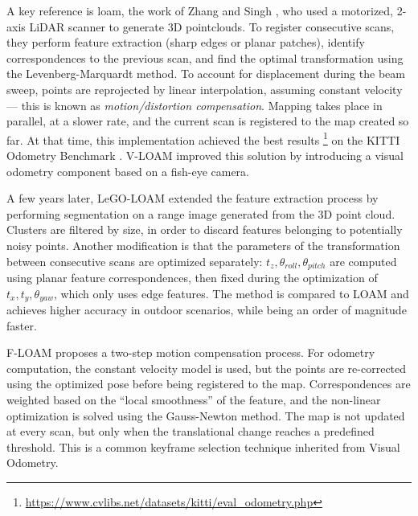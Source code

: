 


A key reference is \acrfull{loam}, the work of Zhang and Singh \cite{zhang2014loam}, who used a motorized, 2-axis LiDAR scanner to generate 3D pointclouds. To register consecutive scans, they perform feature extraction (sharp edges or planar patches), identify correspondences to the previous scan, and find the optimal transformation using the Levenberg-Marquardt method. To account for displacement during the beam sweep, points are reprojected by linear interpolation, assuming constant velocity --- this is known as \emph{motion/distortion compensation}. Mapping takes place in parallel, at a slower rate, and the current scan is registered to the map created so far. At that time, this implementation achieved the best results \footnote{\url{https://www.cvlibs.net/datasets/kitti/eval_odometry.php}} on the KITTI Odometry Benchmark \cite{geiger2012kitti}. V-LOAM \cite{zhang2015visual} improved this solution by introducing a visual odometry component based on a fish-eye camera.

A few years later, LeGO-LOAM \cite{legoloam2018} extended the feature extraction process by performing segmentation on a range image generated from the 3D point cloud. Clusters are filtered by size, in order to discard features belonging to potentially noisy points. Another modification is that the parameters of the transformation between consecutive scans are optimized separately: $t_z, \theta_{roll}, \theta_{pitch}$ are computed using planar feature correspondences, then fixed during the optimization of $t_x, t_y, \theta_{yaw}$, which only uses edge features. The method is compared to LOAM and achieves higher accuracy in outdoor scenarios, while being an order of magnitude faster.

F-LOAM \cite{wang2021f} proposes a two-step motion compensation process. For odometry computation, the constant velocity model is used, but the points are re-corrected using the optimized pose before being registered to the map. Correspondences are weighted based on the ``local smoothness'' of the feature, and the non-linear optimization is solved using the Gauss-Newton method. The map is not updated at every scan, but only when the translational change reaches a predefined threshold. This is a common \gls{keyframe} selection technique inherited from Visual Odometry.

